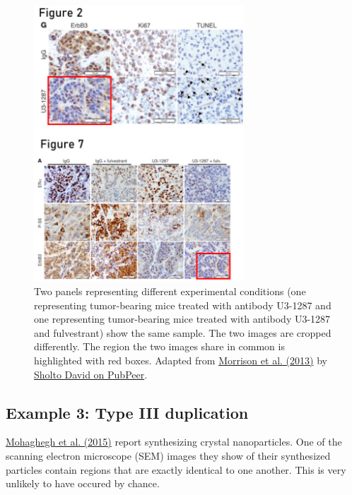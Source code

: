 \documentclass[letterpaper, 12pt]{article}
\begin{document}
\begin{figure}[h!tbp]
    \centering
    \includegraphics[width=0.7\textwidth]{img/image_duplication/image-1744937642757.jpg}
    \caption*{Two panels representing different experimental conditions (one representing tumor-bearing mice treated with antibody U3-1287 and one representing tumor-bearing mice treated with antibody U3-1287 and fulvestrant) show the same sample. The two images are cropped differently. The region the two images share in common is highlighted with red boxes. Adapted from \href{https://doi.org/10.1172/JCI66764}{Morrison et al. (2013)} by \href{https://pubpeer.com/publications/2768B5B42E7338AB72D4CFE660596A\#2}{Sholto David on PubPeer}.}
\end{figure}

\subsection*{Example 3: Type III duplication}

\href{https://doi.org/10.1007/s10853-015-9003-3}{Mohaghegh et al. (2015)} report synthesizing crystal nanoparticles. One of the scanning electron microscope (SEM) images they show of their synthesized particles contain regions that are exactly identical to one another. This is very unlikely to have occured by chance.
\end{document}
